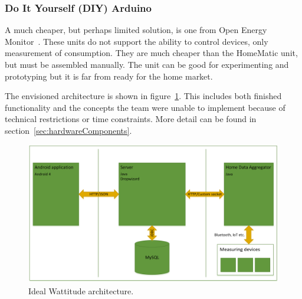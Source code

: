 \subsubsection{Do It Yourself (DIY) Arduino}
A much cheaper, but perhaps limited solution, is one from Open Energy Monitor~\cite{oemmodule}. These units do not support the ability to control devices, only measurement of consumption. They are much cheaper than the HomeMatic unit, but must be assembled manually. The unit can be good for experimenting and prototyping but it is far from ready for the home market.





The envisioned architecture is shown in figure~\ref{fig:idealArchitecture}. This includes both finished functionality and the concepts the team were unable to implement because of technical restrictions or time constraints. More detail can be found in section~\ref{sec:hardwareComponents}.


\begin{figure}[H]
\centering
\includegraphics[height=0.3\textheight]{ch/further/fig/architecture.png}
\caption{Ideal Wattitude architecture.}
\label{fig:idealArchitecture}
\end{figure}
